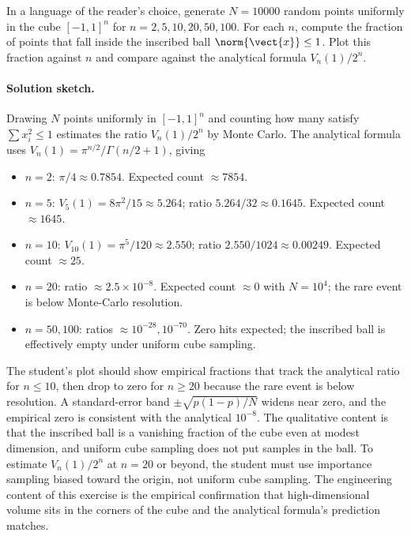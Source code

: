 \begin{exercise}
In a language of the reader's choice, generate $N = 10000$ random
points uniformly in the cube $[-1, 1]^{n}$ for $n = 2, 5, 10, 20,
50, 100$. For each $n$, compute the fraction of points that fall
inside the inscribed ball $\norm{\vect{x}} \leq 1$. Plot this
fraction against $n$ and compare against the analytical formula
$V_{n}(1) / 2^{n}$.

\paragraph{Solution sketch.} Drawing $N$ points uniformly in
$[-1, 1]^{n}$ and counting how many satisfy $\sum x_{i}^{2} \leq 1$
estimates the ratio $V_{n}(1)/2^{n}$ by Monte Carlo. The analytical
formula uses $V_{n}(1) = \pi^{n/2}/\Gamma(n/2 + 1)$, giving
\begin{itemize}[leftmargin=*]
  \item $n = 2$: $\pi/4 \approx 0.7854$. Expected count $\approx
    7854$.
  \item $n = 5$: $V_{5}(1) = 8\pi^{2}/15 \approx 5.264$; ratio
    $5.264/32 \approx 0.1645$. Expected count $\approx 1645$.
  \item $n = 10$: $V_{10}(1) = \pi^{5}/120 \approx 2.550$; ratio
    $2.550/1024 \approx 0.00249$. Expected count $\approx 25$.
  \item $n = 20$: ratio $\approx 2.5 \times 10^{-8}$. Expected
    count $\approx 0$ with $N = 10^{4}$; the rare event is below
    Monte-Carlo resolution.
  \item $n = 50, 100$: ratios $\approx 10^{-28}, 10^{-70}$. Zero
    hits expected; the inscribed ball is effectively empty under
    uniform cube sampling.
\end{itemize}
The student's plot should show empirical fractions that track the
analytical ratio for $n \leq 10$, then drop to zero for $n \geq 20$
because the rare event is below resolution. A standard-error band
$\pm \sqrt{p(1-p)/N}$ widens near zero, and the empirical zero is
consistent with the analytical $10^{-8}$. The qualitative content is
that the inscribed ball is a vanishing fraction of the cube even
at modest dimension, and uniform cube sampling does not put samples
in the ball. To estimate $V_{n}(1)/2^{n}$ at $n = 20$ or beyond, the
student must use importance sampling biased toward the origin, not
uniform cube sampling. The engineering content of this exercise is
the empirical confirmation that high-dimensional volume sits in the
corners of the cube and the analytical formula's prediction
matches.
\end{exercise}

